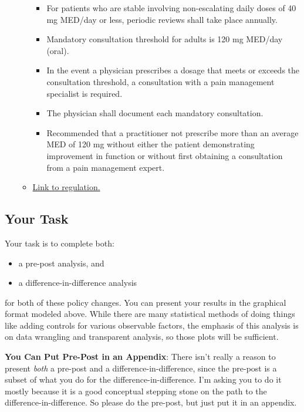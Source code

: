 \documentclass[12pt]{article}
\begin{document}
\begin{itemize}
\begin{itemize}
    \begin{itemize}
      \item For patients who are stable involving non-escalating daily doses of 40 mg MED/day or less, periodic reviews shall take place annually.
      \item Mandatory consultation threshold for adults is 120 mg MED/day (oral).
      \item In the event a physician prescribes a dosage that meets or exceeds the consultation
      threshold, a consultation with a pain management specialist is required.
      \item The physician shall document each mandatory consultation.
      \item Recommended that a practitioner not prescribe more than an average MED of
      120 mg without either the patient demonstrating improvement in function or without first obtaining a consultation from a pain management expert.
    \end{itemize}
    \item \href{http://apps.leg.wa.gov/documents/laws/wsr/2011/12/11-12-025.htm}{Link to regulation.}
    \end{itemize}
\end{itemize}


\subsection*{Your Task}

Your task is to complete both:

\begin{itemize}
  \item a pre-post analysis, and
  \item a difference-in-difference analysis
\end{itemize}

for both of these policy changes. You can present your results in the graphical format modeled above. While there are many statistical methods of doing things like adding controls for various observable factors, the emphasis of this analysis is on data wrangling and transparent analysis, so those plots will be sufficient.

\textbf{You Can Put Pre-Post in an Appendix}: There isn't really a reason to present \emph{both} a pre-post and a difference-in-difference, since the pre-post is a subset of what you do for the difference-in-difference. I'm asking you to do it mostly because it is a good conceptual stepping stone on the path to the difference-in-difference. So please do the pre-post, but just put it in an appendix.
\end{document}
